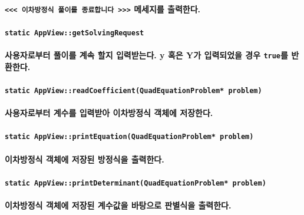 \documentclass[UTF8]{report}
\begin{document}
            \paragraph{%
                \normalfont \texttt{<<< 이차방정식 풀이를 종료합니다 >>>} 메세지를 출력한다.
            }

            \paragraph{\texttt{static AppView::getSolvingRequest}}
            \paragraph{%
                \normalfont 사용자로부터 풀이를 계속 할지 입력받는다. y 혹은 Y가 입력되었을 경우 \texttt{true}를 반환한다.
            }

            \paragraph{\texttt{static AppView::readCoefficient(QuadEquationProblem* problem)}}
            \paragraph{%
                \normalfont 사용자로부터 계수를 입력받아 이차방정식 객체에 저장한다.
            }
            
            \paragraph{\texttt{static AppView::printEquation(QuadEquationProblem* problem)}}
            \paragraph{%
                \normalfont 이차방정식 객체에 저장된 방정식을 출력한다.
            }

            \paragraph{\texttt{static AppView::printDeterminant(QuadEquationProblem* problem)}}
            \paragraph{%
                \normalfont 이차방정식 객체에 저장된 계수값을 바탕으로 판별식을 출력한다.
            }
\end{document}
